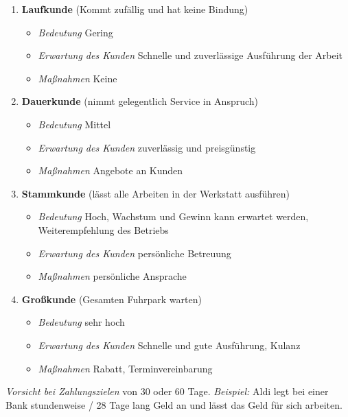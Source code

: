 \begin{enumerate}
\item
  \textbf{Laufkunde} (Kommt zufällig und hat keine Bindung)

  \begin{itemize}
  \item
    \emph{Bedeutung} Gering
  \item
    \emph{Erwartung des Kunden} Schnelle und zuverlässige Ausführung der
    Arbeit
  \item
    \emph{Maßnahmen} Keine
  \end{itemize}
\item
  \textbf{Dauerkunde} (nimmt gelegentlich Service in Anspruch)

  \begin{itemize}
  \item
    \emph{Bedeutung} Mittel
  \item
    \emph{Erwartung des Kunden} zuverlässig und preisgünstig
  \item
    \emph{Maßnahmen} Angebote an Kunden
  \end{itemize}
\item
  \textbf{Stammkunde} (lässt alle Arbeiten in der Werkstatt ausführen)

  \begin{itemize}
  \item
    \emph{Bedeutung} Hoch, Wachstum und Gewinn kann erwartet werden,
    Weiterempfehlung des Betriebs
  \item
    \emph{Erwartung des Kunden} persönliche Betreuung
  \item
    \emph{Maßnahmen} persönliche Ansprache
  \end{itemize}
\item
  \textbf{Großkunde} (Gesamten Fuhrpark warten)

  \begin{itemize}
  \item
    \emph{Bedeutung} sehr hoch
  \item
    \emph{Erwartung des Kunden} Schnelle und gute Ausführung, Kulanz
  \item
    \emph{Maßnahmen} Rabatt, Terminvereinbarung
  \end{itemize}
\end{enumerate}

\emph{Vorsicht bei Zahlungszielen} von 30 oder 60 Tage. \emph{Beispiel:}
Aldi legt bei einer Bank stundenweise / 28 Tage lang Geld an und lässt
das Geld für sich arbeiten.

